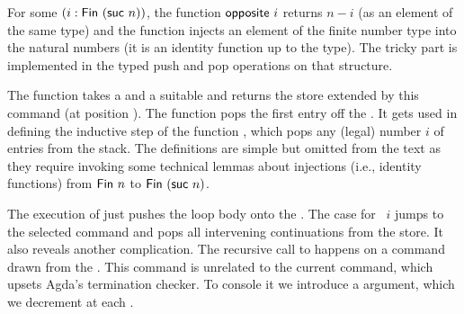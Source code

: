 \documentclass[acmsmall,screen,anonymous,review]{acmart}
\begin{document}
For some $(i : \AFin~(\Asuc~ n))$, the function
$\AgdaFunction{opposite}~i$ returns $n-i$ (as an element of the same
type) and the function {\AtoN} injects an element of the finite number
type into the natural numbers (it is an identity function up to the type). The tricky part is implemented in the
typed push and pop operations on that structure.
\rstPops

The  function takes a {\ACommandStore} and a
suitable {\ACommand} and returns the store extended by this command
(at position {\Azero}). 
The  function pops the first entry off the
{\ACommandStore}. It gets used in defining the inductive step of the
function , which pops any (legal) number $i$ of entries
from the stack. The definitions are simple but omitted from the text
as they require invoking some technical lemmas about injections (i.e.,
identity functions) from $\AFin~n$ to $\AFin~(\Asuc~n)$.

\rstExecutorSignature\vspace{-1.5\baselineskip}
\rstExecutor

The execution of {\AMU} just pushes the loop body onto the
{\ACommandStore}.
The case for {\ACONTINUE~$i$} jumps to the selected command and pops
all intervening continuations from the store. It also reveals another complication. The recursive
call to {\Aexecutor} happens on a command drawn from the {\ACommandStore}. This
command is unrelated to the current command, which upsets Agda's
termination checker. To console it we introduce a 
argument, which we decrement at each {\ACONTINUE}.
\end{document}
